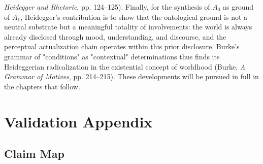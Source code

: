\textit{Heidegger and Rhetoric}, pp. 124--125). Finally, for the synthesis of $A_0$ as ground of $A_1$, Heidegger's contribution is to show that the ontological ground is not a neutral substrate but a meaningful totality of involvements: the world is always already disclosed through mood, understanding, and discourse, and the perceptual actualization chain operates within this prior disclosure. Burke's grammar of "conditions" as "contextual" determinations thus finds its Heideggerian radicalization in the existential concept of worldhood (Burke, \textit{A Grammar of Motives}, pp. 214--215). These developments will be pursued in full in the chapters that follow. 
\section*{Validation Appendix}


\subsection*{Claim Map}

